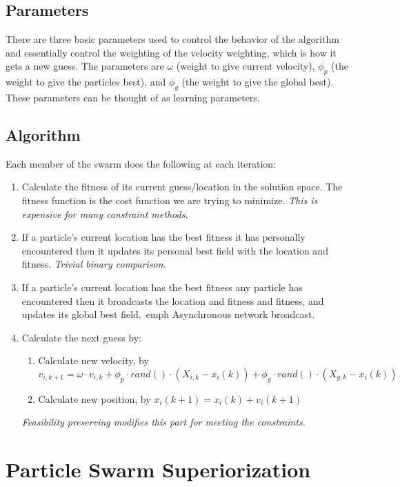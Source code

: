 \documentclass{article}
\begin{document}
\subsection{Parameters}
There are three basic parameters used to control the behavior of the algorithm and essentially control the weighting of the velocity weighting, which is how it gets a new guess.  The parameters are $\omega$ (weight to give current velocity), 
$\phi_p$ (the weight to give the particles best), and $\phi_g$ (the weight to give the global best).  These parameters can be thought of as learning parameters.

\subsection{Algorithm}
Each member of the swarm does the following at each iteration:
\begin{enumerate}
\item Calculate the fitness of its current guess/location in the solution space.  The fitness function is the cost function we are trying to minimize. \emph{This is expensive for many constraint methods.}
\item If a particle's current location has the best fitness it has personally encountered then it updates its personal best field with the location and fitness. \emph{ Trivial binary comparison.}
\item If a particle's current location has the best fitness any particle has encountered then it broadcasts the location and fitness and fitness, and updates its global best field.\ emph{ Asynchronous network broadcast.}
\item Calculate the next guess by:
    \begin{enumerate}
    \item Calculate new velocity, by $v_{i,k+1}=\omega\cdot v_{i,k} + \phi_p\cdot rand()\cdot(X_{i,k}-x_i(k)) + \phi_g\cdot rand()\cdot(X_{g,k}-x_i(k))$
    \item Calculate new position, by $x_i(k+1)=x_i(k)+v_i(k+1)$
    \end{enumerate}
    \emph{Feasibility preserving modifies this part for meeting the constraints.}
\end{enumerate}


\section{Particle Swarm Superiorization}
\end{document}
